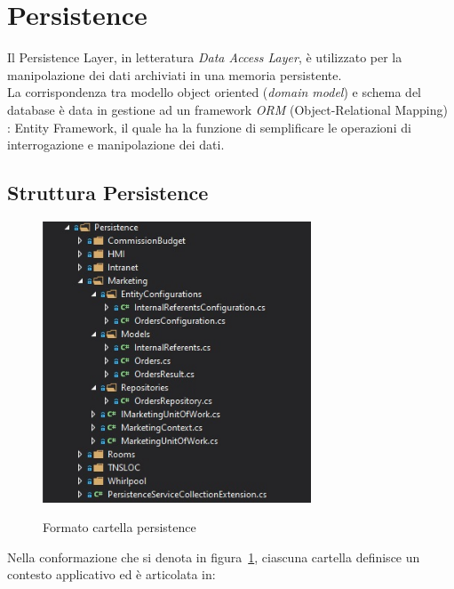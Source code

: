 \section{Persistence}
\label{chap:persistence}
Il Persistence Layer, in letteratura \textit{Data Access Layer}, è utilizzato per la manipolazione dei dati archiviati in una memoria persistente.\\
La corrispondenza tra modello object oriented (\textit{domain model}) e schema del database è data in gestione ad un framework \textit{ORM} (Object-Relational Mapping) \cite{EF}: Entity Framework, il quale ha la funzione di semplificare le operazioni di interrogazione e manipolazione dei dati.

\subsection{Struttura Persistence}
\begin{figure}[h!]
\begin{center}
  \includegraphics[width=8cm]{images/Persistence.jpg}\\
  \caption{Formato cartella persistence}\label{fig:persistence}
\end{center}
\end{figure}

Nella conformazione che si denota in figura~\ref{fig:persistence}, ciascuna cartella definisce un contesto applicativo ed è articolata in:

